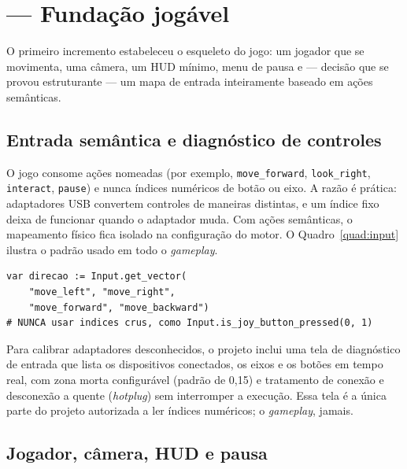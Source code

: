 \section{ --- Fundação jogável}
\label{sec:poc1}

O primeiro incremento estabeleceu o esqueleto do jogo: um jogador que se
movimenta, uma câmera, um HUD mínimo, menu de pausa e --- decisão que se
provou estruturante --- um mapa de entrada inteiramente baseado em ações
semânticas.

\subsection{Entrada semântica e diagnóstico de controles}

O jogo consome ações nomeadas (por exemplo, \texttt{move\_forward},
\texttt{look\_right}, \texttt{interact}, \texttt{pause}) e nunca índices
numéricos de botão ou eixo. A razão é prática: adaptadores USB convertem
controles de maneiras distintas, e um índice fixo deixa de funcionar quando o
adaptador muda. Com ações semânticas, o mapeamento físico fica isolado na
configuração do motor. O Quadro~\ref{quad:input} ilustra o padrão usado em
todo o \emph{gameplay}.

\begin{quadro}[htbp]
\centering
\caption{Padrão de leitura de entrada usado no gameplay (GDScript).}
\label{quad:input}
\begin{verbatim}
var direcao := Input.get_vector(
    "move_left", "move_right",
    "move_forward", "move_backward")
# NUNCA usar indices crus, como Input.is_joy_button_pressed(0, 1)
\end{verbatim}
\par\vspace{2pt}{\footnotesize Fonte: elaborado pelo autor (2026), a partir do código do projeto.}
\end{quadro}

Para calibrar adaptadores desconhecidos, o projeto inclui uma tela de
diagnóstico de entrada que lista os dispositivos conectados, os eixos e os
botões em tempo real, com zona morta configurável (padrão de 0,15) e
tratamento de conexão e desconexão a quente (\emph{hotplug}) sem interromper a
execução. Essa tela é a única parte do projeto autorizada a ler índices
numéricos; o \emph{gameplay}, jamais.

\subsection{Jogador, câmera, HUD e pausa}

